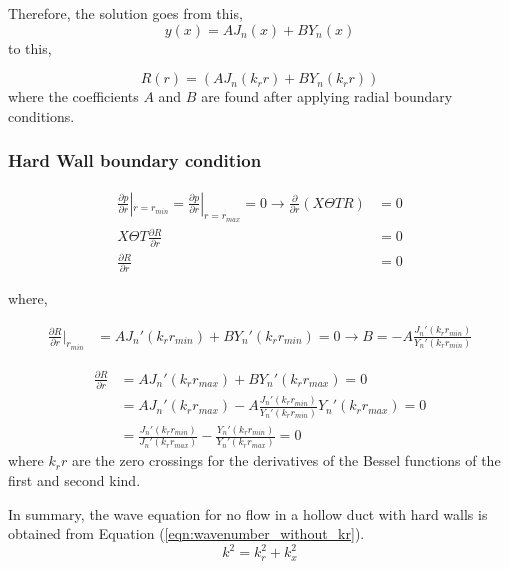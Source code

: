 \documentclass[a4paper]{article}
\begin{document}
Therefore, the solution goes from this,
\begin{equation}
    y(x) = AJ_n(x) + BY_n(x)
    \label{eqn:besselsolution}
\end{equation}
to this,


\begin{equation}
    R(r) = (AJ_n(k_r r) + BY_n(k_r r)) 
    \label{eqn:besselsolution}
\end{equation}
where the coefficients $A$ and $B$ are found after applying radial
boundary conditions. %




\subsubsection{Hard Wall boundary condition}
\begin{align*}
    \frac{\partial p}{\partial r}|_{r = r_{min}}  =\frac{\partial p}{\partial r}|_{r = r_{max}} = 0 \rightarrow 
    \frac{\partial}{\partial r} \left( X\Theta T R \right) &= 0 \\
    X \Theta T\frac{\partial R}{\partial r}  &= 0 \\
    \frac{\partial R}{\partial r}  &= 0 
\end{align*}

where,


\begin{align*} 
    \frac{ \partial R}{\partial r}|_{r_{min}} &= AJ_n'(k_r r_{min}) + B Y_n' (k_r r_{min}) = 0 
    \rightarrow B = -A \frac{J_n'(k_r r_{min})}{Y_n'(k_r r_{min})}
\end{align*}


\begin{align*} 
    \frac{ \partial R}{\partial r} &= AJ_n'(k_r r_{max}) + B Y_n' (k_r r_{max}) = 0 \\
                                   &= AJ_n'(k_r r_{max}) - A\frac{J_n' (k_r r_{min})}{Y_n'(k_r r_{min})} Y_n' (k_r r_{max}) = 0 \\
                                   &= \frac{J_n'(k_r r_{min})}{J_n' (k_r r_{max})} - \frac{Y_n'(k_r r_{min})}{Y_n' (k_r r_{max})} = 0 
\end{align*}
where $k_r r$ are the zero crossings for the derivatives of the Bessel functions of the first and second kind.

In summary, the wave equation for no flow in a hollow duct with hard walls is obtained 
from Equation (\ref{eqn:wavenumber_without_kr}).
\begin{equation}
    k^2 = k_r^2 + k_x^2
    \label{eqn:wavenumber_equation}
\end{equation}
\end{document}
